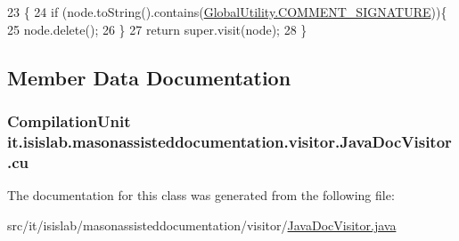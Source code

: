 \begin{DoxyCode}
23                                        \{
24         \textcolor{keywordflow}{if} (node.toString().contains(\hyperlink{classit_1_1isislab_1_1masonassisteddocumentation_1_1mason_1_1analizer_1_1_global_utility_a9191677742da30af21771374343da817}{GlobalUtility.COMMENT\_SIGNATURE}))\{
25             node.delete();
26         \}   
27         \textcolor{keywordflow}{return} super.visit(node);
28     \}
\end{DoxyCode}


\subsection{Member Data Documentation}
\hypertarget{classit_1_1isislab_1_1masonassisteddocumentation_1_1visitor_1_1_java_doc_visitor_a89fac3d92c14e8f684fe42515dcd2088}{
\subsubsection[{cu}]{\setlength{\rightskip}{0pt plus 5cm}Compilation\-Unit it.\-isislab.\-masonassisteddocumentation.\-visitor.\-Java\-Doc\-Visitor.\-cu\hspace{0.3cm}{\ttfamily [private]}}}\label{classit_1_1isislab_1_1masonassisteddocumentation_1_1visitor_1_1_java_doc_visitor_a89fac3d92c14e8f684fe42515dcd2088}


The documentation for this class was generated from the following file\-:\begin{DoxyCompactItemize}
\item 
src/it/isislab/masonassisteddocumentation/visitor/\hyperlink{_java_doc_visitor_8java}{Java\-Doc\-Visitor.\-java}\end{DoxyCompactItemize}
